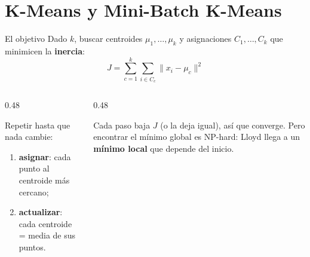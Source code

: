 \documentclass[aspectratio=169,12pt]{beamer}
\begin{document}
\section{K-Means y Mini-Batch K-Means}

\begin{frame}{El objetivo}
  \small Dado $k$, buscar centroides $\mu_1,\dots,\mu_k$ y asignaciones $C_1,\dots,C_k$ que minimicen la \textbf{inercia}:
  \[ J = \sum_{c=1}^{k} \sum_{i \in C_c} \lVert x_i - \mu_c \rVert^2 \]
  \begin{columns}[T]
    \begin{column}{0.48\textwidth}
      \begin{defbox}
        \small Repetir hasta que nada cambie:
        \begin{enumerate}
          \item \textbf{asignar}: cada punto al centroide más cercano;
          \item \textbf{actualizar}: cada centroide = media de sus puntos.
        \end{enumerate}
      \end{defbox}
    \end{column}
    \begin{column}{0.48\textwidth}
      \begin{goldbox}[Garantías]
        \small Cada paso baja $J$ (o la deja igual), así que converge. Pero encontrar el mínimo global es NP-hard: Lloyd llega a un \textbf{mínimo local} que depende del inicio.
      \end{goldbox}
    \end{column}
  \end{columns}
\end{frame}
\end{document}

